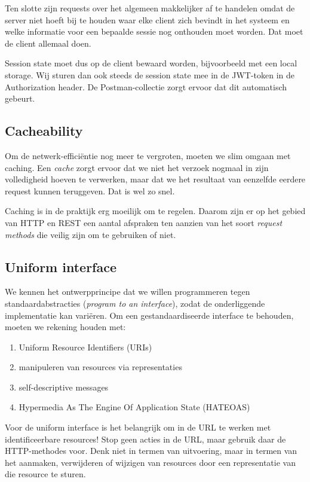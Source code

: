 Ten slotte zijn requests over het algemeen makkelijker af te handelen 
omdat de server niet hoeft bij te houden waar elke client zich bevindt 
in het systeem en welke informatie voor een bepaalde sessie nog onthouden 
moet worden. Dat moet de client allemaal doen.

Session state moet dus op de client bewaard worden, 
bijvoorbeeld met een local storage.
Wij sturen dan ook steeds de session state 
mee in de JWT-token in de Authorization header.
De Postman-collectie zorgt ervoor dat dit automatisch gebeurt.

\subsection{Cacheability}
Om de netwerk-efficiëntie nog meer te vergroten, moeten we slim 
omgaan met caching. Een \textit{cache} zorgt ervoor dat we niet 
het verzoek nogmaal in zijn volledigheid hoeven te verwerken,
maar dat we het resultaat van eenzelfde eerdere request 
kunnen teruggeven. Dat is wel zo snel.

Caching is in de praktijk erg moeilijk om te regelen. Daarom 
zijn er op het gebied van HTTP en REST een aantal afspraken ten 
aanzien van het soort \textit{request methods} die veilig zijn 
om te gebruiken of niet.

\subsection{Uniform interface}
We kennen het ontwerpprincipe dat we willen programmeren tegen 
standaardabstracties (\textit{program to an interface}), zodat 
de onderliggende implementatie kan variëren. Om een gestandaardiseerde 
interface te behouden, moeten we rekening houden met:
\begin{enumerate}
    \item Uniform Resource Identifiers (URIs)
    \item manipuleren van resources via representaties
    \item self-descriptive messages
    \item Hypermedia As The Engine Of Application State (HATEOAS)
\end{enumerate}

Voor de uniform interface is het belangrijk 
om in de URL te werken met identificeerbare 
resources! Stop geen acties in de URL, maar gebruik
daar de HTTP-methodes voor. Denk niet in termen van uitvoering,
maar in termen van het aanmaken, verwijderen of wijzigen van 
resources door een representatie van die resource te sturen. 

